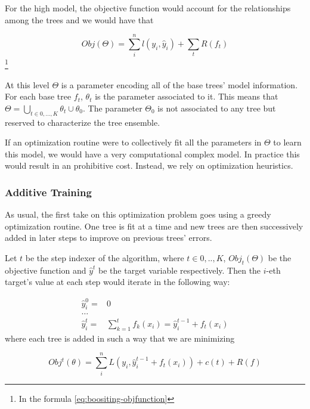 For the high model, the objective function would account for the relationships among the trees and we would have that

\begin{equation}
Obj(\Theta) = \sum_i^n l(y_i,\hat{y}_i) + \sum_t R(f_t)
\end{equation}\label{eq:boositing-objfunction}\footnote{In the formula \cref{eq:boositing-objfunction} }

At this level $\Theta$ is a parameter encoding all of the base trees' model information. For each base tree $f_t$, $\theta_t$ is the parameter associated to it. This means that $\Theta = \bigcup_{t \in {0,\ldots,K}} \theta_t \cup \theta_0$. The parameter $\Theta_0$ is not associated to any tree but reserved to characterize the tree ensemble.

If an optimization routine were to collectively fit all the parameters in $\Theta$ to learn this model, we would have a very computational complex model. In practice this would result in an prohibitive cost. Instead, we rely on optimization heuristics.

\subsubsection{Additive Training}

As usual, the first take on this optimization problem goes using a greedy optimization routine. One tree is fit at a time and new trees are then successively added in later steps to improve on previous trees' errors.

Let $t$ be the step indexer of the algorithm, where $t \in {0,..,K}$, $Obj_t(\Theta)$ be the objective function and $\hat{y}^t$ be the target variable respectively. Then the $i$-eth target's value at each step would iterate in the following way:

\begin{equation}\label{eq:gb-targetSteps}
\begin{split}
\hat{y}_i^0 = & 0 \\
\ldots \\
\hat{y}_i^t = &\sum_{k=1}^{t} f_k(x_i) = \hat{y}^{t-1}_i + f_t(x_i)
\end{split}
\end{equation}
where each tree is added in such a way that we are minimizing

\begin{equation}
Obj^t(\theta) = \sum_i^n L(y_i, \hat{y}^{t-1}_i + f_t(x_i) ) + c(t) + R(f)
\end{equation}



